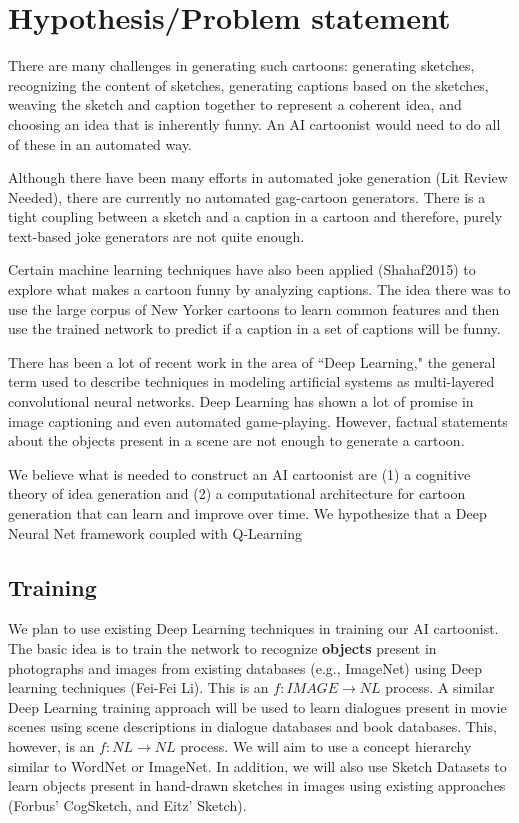 \documentclass[letter]{article}
\begin{document}
\section{Hypothesis/Problem statement}

There are many challenges in generating such cartoons: generating sketches, recognizing the content of sketches, generating captions based on the sketches, weaving the sketch and caption together to represent a coherent idea, and choosing an idea that is inherently funny. An AI cartoonist would need to do all of these in an automated way. 

Although there have been many efforts in automated joke generation (Lit Review Needed), there are currently no automated gag-cartoon generators. There is a tight coupling between a sketch and a caption in a cartoon and therefore, purely text-based joke generators are not quite enough. 

Certain machine learning techniques have also been applied (Shahaf2015) to explore what makes a cartoon funny by analyzing captions. The idea there was to use the large corpus of New Yorker cartoons to learn common features and then use the trained network to predict if a caption in a set of captions will be funny. 

There has been a lot of recent work in the area of ``Deep Learning," the general term used to describe techniques in modeling artificial systems as multi-layered convolutional neural networks. Deep Learning has shown a lot of promise in image captioning and even automated game-playing. However, factual statements about the objects present in a scene are not enough to generate a cartoon. 

We believe what is needed to construct an AI cartoonist are (1) a cognitive theory of idea generation and (2) a computational architecture for cartoon generation that can learn and improve over time. We hypothesize that a Deep Neural Net framework coupled with Q-Learning 


\subsection{Training}

We plan to use existing Deep Learning techniques in training our AI cartoonist. The basic idea is to train the network to recognize \textbf{objects} present in photographs and images from existing databases (e.g., ImageNet) using Deep learning techniques (Fei-Fei Li). This is an $f: IMAGE \rightarrow NL$ process.  A similar Deep Learning training approach will be used to learn dialogues present in movie scenes using scene descriptions in dialogue databases and book databases. This, however, is an $f: NL\rightarrow NL$ process. We will aim to use a concept hierarchy similar to WordNet or ImageNet. In addition, we will also use Sketch Datasets to learn objects present in hand-drawn sketches in images using existing approaches (Forbus' CogSketch, and Eitz' Sketch). 
\end{document}
